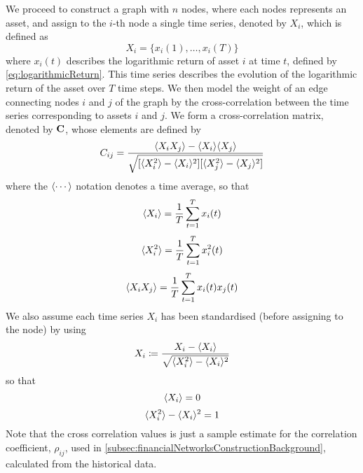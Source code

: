 We proceed to construct a graph with $n$ nodes, where each nodes represents an asset, and assign to the $i$-th node a single time series, denoted by $X_{i}$, which is defined as
\begin{equation}
	\label{eq:singleTimeSeries}
	X_{i} = \{x_{i}(1),\dots,x_{i}(T)\}
\end{equation}
where $x_{i}(t)$ describes the logarithmic return of asset $i$ at time $t$, defined by \cref{eq:logarithmicReturn}.
This time series describes the evolution of the logarithmic return of the asset over $T$ time steps.
We then model the weight of an edge connecting nodes $i$ and $j$ of the graph by the cross-correlation between the time series corresponding to assets $i$ and $j$. We form a cross-correlation matrix, denoted by $\mathbf C$, whose elements are defined by
\begin{equation}
	\label{eq:crossCorrelationMatrix}
	C_{ij} = \frac{\langle X_{i} X_{j}\rangle - \langle X_{i}\rangle \langle X_{j}\rangle}{\sqrt{[\langle X_{i}^{2}\rangle - \langle X_{i}\rangle^{2}][\langle X_{j}^{2}\rangle - \langle X_{j}\rangle^{2}]}}
\end{equation}
where the $\langle\cdots\rangle$ notation denotes a time average, so that
\begin{equation}
	\label{eq:temporalMean}
	\langle X_{i}\rangle = \frac{1}{T} \sum_{t=1}^{T} x_{i}(t)
\end{equation}
\begin{equation}
	\label{eq:temporalMeanSquare}
	\langle X_{i}^{2}\rangle = \frac{1}{T} \sum_{t=1}^{T} x_{i}^{2}(t)
\end{equation}
\begin{equation}
	\label{eq:temporalMeanProduct}
	\langle X_{i}X_{j}\rangle = \frac{1}{T} \sum_{t=1}^{T} x_{i}(t)x_{j}(t)
\end{equation}
We also assume each time series $X_{i}$ has been standardised (before assigning to the node) by using
\begin{equation}
	\label{eq:standardiseTimeSeries}
	X_{i} \coloneqq \frac{X_{i} - \langle X_{i}\rangle}{\sqrt{\langle X_{i}^{2}\rangle - \langle X_{i}\rangle^{2}}}
\end{equation}
so that
\begin{equation}
	\label{eq:zeroTemporalMean}
	\langle X_{i}\rangle = 0
\end{equation}
\begin{equation}
	\label{eq:unitTemporalVariance}
	\langle X_{i}^{2}\rangle - \langle X_{i}\rangle^{2} = 1
\end{equation}
Note that the cross correlation values is just a sample estimate for the correlation coefficient, $\rho_{ij}$, used in \cref{subsec:financialNetworksConstructionBackground}, calculated from the historical data.

